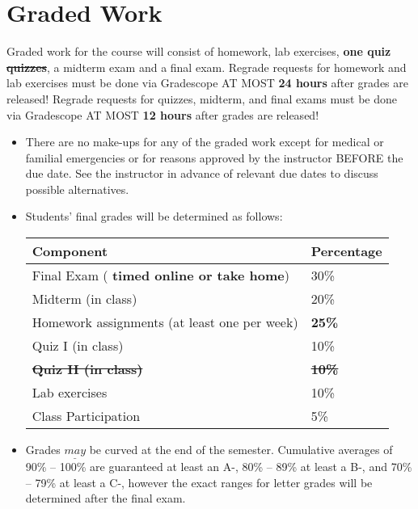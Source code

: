 \documentclass[11pt, a4paper]{article}
\begin{document}
\section{Graded Work} 
Graded work for the course will consist of homework, lab exercises, {\color{darkred} \textbf{one quiz} \sout{\textbf{quizzes}}}, a midterm exam and a final exam. Regrade requests for homework and lab exercises must be done via Gradescope AT MOST \textbf{24 hours} after grades are released! Regrade requests for quizzes, midterm, and final exams must be done via Gradescope AT MOST \textbf{12 hours} after grades are released!
\begin{itemize}[label= {\color{darkblue}{\ArrowBoldRightStrobe}}]
	\item There are no make-ups for any of the graded work except for medical or familial emergencies or for reasons approved by the instructor BEFORE the due date. See the instructor in advance of relevant due dates to discuss possible alternatives. 
	
	\item Students' final grades will be determined as follows:
	\begin{table}[h]
		\centering
		\begin{tabular}{ll}
			Component & Percentage \\ 
			\hline
			Final Exam ({\color{darkred} \textbf{timed online or take home}}) & 30\% \\ 
			Midterm (in class) & 20\% \\
			Homework assignments (at least one per week) & {\color{darkred} \textbf{25\%}}\\
			Quiz I (in class) & 10\% \\
			{\color{darkred} \textbf{\sout{Quiz II (in class)}}} & {\color{darkred} \textbf{\sout{10\%}}}  \\
			Lab exercises & 10\% \\
			Class Participation & 5\% \\
			\hline 
		\end{tabular}
	\end{table}

	\item Grades $\underline{may}$ be curved at the end of the semester. Cumulative averages of 90\% -- 100\% are guaranteed at least an A-, 80\% -- 89\% at least a B-, and 70\% -- 79\% at least a C-, however the exact ranges for letter grades will be determined after the final exam.
	

\end{itemize}
\end{document}
